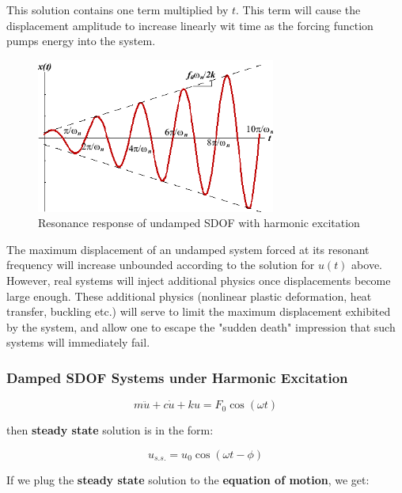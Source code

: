 \documentclass[10pt,b5paper,titlepage]{book}
\begin{document}
This solution contains one term multiplied by $ t $. This term will cause the displacement
amplitude to increase linearly wit time as the forcing function pumps energy into
the system.

\begin{figure}[ht]
    \centering
    \includegraphics[width=0.70\textwidth]{img/SDOF_Undamped_Harmonic_Response.png}
    \caption{Resonance response of undamped SDOF with harmonic excitation}
    \label{fig:SDOF-undamped-harmonic-response-png}
\end{figure}

The maximum displacement of an undamped system forced at its resonant frequency will
increase unbounded according to the solution for $ u(t) $ above. However, real systems
will inject additional physics once displacements become large enough. These
additional physics (nonlinear plastic deformation, heat transfer, buckling etc.) will
serve to limit the maximum displacement exhibited by the system, and allow one to escape
the "sudden death" impression that such systems will immediately fail.


\subsubsection{Damped SDOF Systems under Harmonic Excitation}

\begin{equation}
    m \ddot{u} + c \dot{u} + k u = F_0 \cos{\left(\omega t \right)}
\end{equation}

then \textbf{steady state} solution is in the form:

\begin{equation}
    u_{s.s.} = u_0 \cos{\left(\omega t - \phi \right)}
\end{equation}

If we plug the \textbf{steady state} solution to the \textbf{equation of motion},
we get:
\end{document}
